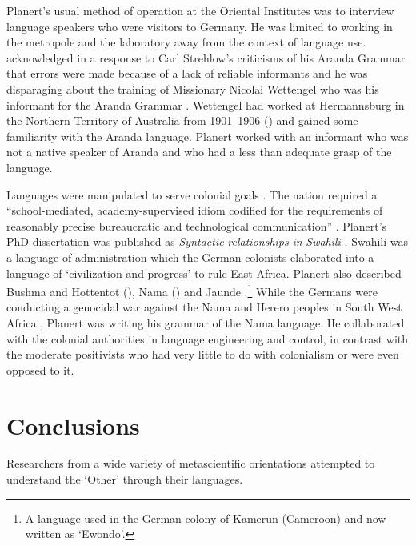 \documentclass[output=paper]{langsci/langscibook}
\begin{document}
Planert’s usual method of operation at the Oriental Institutes was to interview language speakers who were visitors to Germany. He was limited to working in the metropole and the laboratory away from the context of language use. \citet{planert_erwiderung_1908} acknowledged in a response to Carl Strehlow’s criticisms of his Aranda Grammar that errors were made because of a lack of reliable informants and he was disparaging about the training of Missionary Nicolai Wettengel who was his informant for the Aranda Grammar \citep{planert_australische_1907}.  Wettengel had worked at Hermannsburg in the Northern Territory of Australia from 1901--1906 (\citealt[1154]{strehlow_tale_2011}) and gained some familiarity with the Aranda language. Planert worked with an informant who was not a native speaker of Aranda and who had a less than adequate grasp of the language. 

Languages were manipulated to serve colonial goals \citep[88]{errington_linguistics_2008}. The nation required a “school-mediated, academy-supervised idiom codified for the requirements of reasonably precise bureaucratic and technological communication” \citep[57]{gellner_nations_1983}. Planert’s PhD dissertation was published as \textit{Syntactic} \textit{relationships} \textit{in} \textit{Swahili} \citep{planert_syntaktischen_1907}. Swahili was a language of administration which the German colonists elaborated into a language of ‘civilization and progress’ to rule East Africa. Planert also described Bushma and Hottentot (\citeyear{planert_handbuch_1905}), Nama (\citeyear{planert_handbuch_1905}) and Jaunde \citep{nekes_lehrbuch_1911}.\footnote{A language used in the German colony of Kamerun (Cameroon) and now written as ‘Ewondo’.} While the Germans were conducting a genocidal war against the Nama and Herero peoples in South West Africa \citep{hull_military_2005}, Planert was writing his grammar of the Nama language. He collaborated with the colonial authorities in language engineering and control, in contrast with the moderate positivists who had very little to do with colonialism or were even opposed to it. 

\section{Conclusions} 

Researchers from a wide variety of metascientific orientations attempted to understand the ‘Other’ through their languages. 
\end{document}

